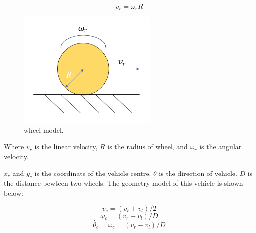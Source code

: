 $$ v_r = \omega_r R $$


\begin{figure}[thb]
    \centering
    \includegraphics[width=0.6\textwidth]{images/wheel_model.png}
    \caption[wheel model]{wheel model.}\label{intro}
\end{figure}
Where $v_r$ is the linear velocity, $R$ is the radius of wheel, and $\omega_r$ is the angular velocity.

$x_c$ and $y_c$ is the coordinate of the vehicle centre. $\theta$ is the direction of vehicle. $D$ is the distance bewteen two wheels. The geometry model of this vehicle is shown below:

$$ v_c = (v_r+v_l)/2 $$
$$ \omega_c = ( v_r - v_l ) / D $$
$$ \dot{\theta_c} = \omega_c = ( v_r - v_l ) / D $$



